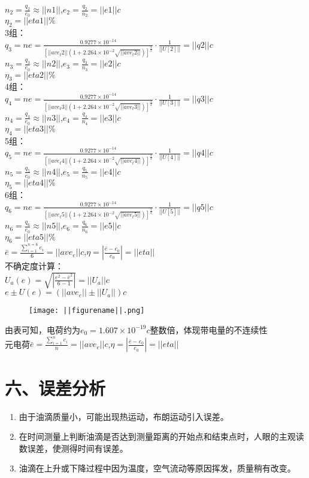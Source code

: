 \indent $n_2=\frac{q_2}{e_0}\approx||n1||$,\quad$e_2=\frac{q_2}{n_2}=||e1||c$\\
\indent $\eta_2=||eta1||\%$\\
3组：\\
\indent $q_{3}=ne=\frac{0.9277\times10^{-14}}
{\left[||ave_t2||\left(1+2.264\times10^{-2}\sqrt{||ave_t2||}\right)\right]^\frac{3}{2}}
\cdot\frac{1}{||U[2]||}=||q2||c$\\
\indent $n_3=\frac{q_3}{e_0}\approx||n2||$,\quad$e_3=\frac{q_3}{n_3}=||e2||c$\\
\indent $\eta_3=||eta2||\%$\\
4组：\\
\indent $q_{4}=ne=\frac{0.9277\times10^{-14}}
{\left[||ave_t3||\left(1+2.264\times10^{-2}\sqrt{||ave_t3||}\right)\right]^\frac{3}{2}}
\cdot\frac{1}{||U[3]||}=||q3||c$\\
\indent $n_4=\frac{q_4}{e_0}\approx||n3||$,\quad$e_4=\frac{q_4}{n_4}=||e3||c$\\
\indent $\eta_4=||eta3||\%$\\
5组：\\
\indent $q_{5}=ne=\frac{0.9277\times10^{-14}}
{\left[||ave_t4||\left(1+2.264\times10^{-2}\sqrt{||ave_t4||}\right)\right]^\frac{3}{2}}
\cdot\frac{1}{||U[4]||}=||q4||c$\\
\indent $n_5=\frac{q_5}{e_0}\approx||n4||$,\quad$e_5=\frac{q_5}{n_5}=||e4||c$\\
\indent $\eta_5=||eta4||\%$\\
6组：\\
\indent $q_{6}=ne=\frac{0.9277\times10^{-14}}
{\left[||ave_t5||\left(1+2.264\times10^{-2}\sqrt{||ave_t5||}\right)\right]^\frac{3}{2}}
\cdot\frac{1}{||U[5]||}=||q5||c$\\
\indent $n_6=\frac{q_6}{e_0}\approx||n5||$,\quad$e_6=\frac{q_6}{n_6}=||e5||c$\\
\indent $\eta_6=||eta5||\%$\\
$\bar{e}=\frac{\sum_{i=1}^{n=6} e_i}{6}=||ave_e||c$,\quad$\eta=|\frac{\bar{e}-e_0}{e_0}|=||eta||$\\
不确定度计算：\\
\indent $U_a(e)=\sqrt{|\frac{\bar{e^2}-\bar{e}^2}{6-1}|}=||U_a||c$\\
\indent $e±U(e)=\left(||ave_e||±||U_a||\right)c$\\
\begin{figure}[H]
\centering
  \texttt{[image: ||figurename||.png]}
\end{figure}
\indent 由表可知，电荷约为$e_0=1.607\times10^{-19}c$整数倍，体现带电量的不连续性\\
\indent 元电荷$\bar{e}=\frac{\sum_{i=1}^{n} e_i}{n}=||ave_e||c$,\quad$\eta=|\frac{\bar{e}-e_0}{e_0}|=||eta||$
\section*{六、误差分析}
\begin{enumerate}
\item 由于油滴质量小，可能出现热运动，布朗运动引入误差。
\item 在时间测量上判断油滴是否达到测量距离的开始点和结束点时，人眼的主观读数误差，使测得时间有误差。
\item 油滴在上升或下降过程中因为温度，空气流动等原因挥发，质量稍有改变。
\end{enumerate}
